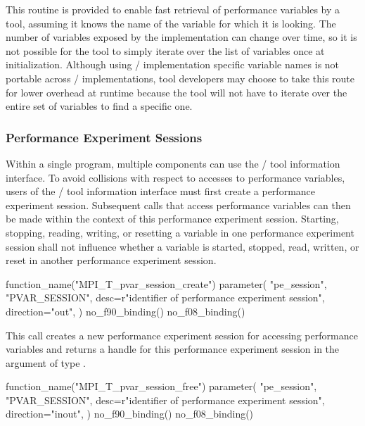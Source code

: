 \begin{rationale}
This routine is provided to enable fast retrieval of performance variables
by a tool, assuming it knows the name of the variable for which it is
looking.  The number of variables exposed by the implementation can change
over time, so it is not possible for the tool to simply iterate over the
list of variables once at initialization.  Although using \MPI/
implementation specific variable names is not portable across \MPI/
implementations, tool developers may choose to take this route for lower
overhead at runtime because the tool will not have to iterate over the
entire set of variables to find a specific one.
\end{rationale}

\subsubsection{Performance Experiment Sessions}
\label{sec:mpit:sessions}

Within a single program, multiple components can use the \MPI/ tool
information interface.  To avoid collisions with respect to accesses to
performance variables, users of the \MPI/ tool information interface must
first create a performance experiment session.  Subsequent calls that
access performance variables can then be made within the context of this
performance experiment session.   Starting, stopping, reading, writing, or
resetting a variable in one performance experiment session shall not
influence whether a variable is started, stopped, read, written, or reset
in another performance experiment session.

\begin{mpi-binding}
    function_name("MPI_T_pvar_session_create")
    parameter(
        "pe_session",
        "PVAR_SESSION",
        desc=r"identifier of performance experiment session",
        direction="out",
    )
    no_f90_binding()
    no_f08_binding()
\end{mpi-binding}

This call creates a new performance experiment session for accessing performance variables and
returns a handle for this performance experiment session in the argument  of type
.

\begin{mpi-binding}
    function_name("MPI_T_pvar_session_free")
    parameter(
        "pe_session",
        "PVAR_SESSION",
        desc=r"identifier of performance experiment session",
        direction="inout",
    )
    no_f90_binding()
    no_f08_binding()
\end{mpi-binding}

